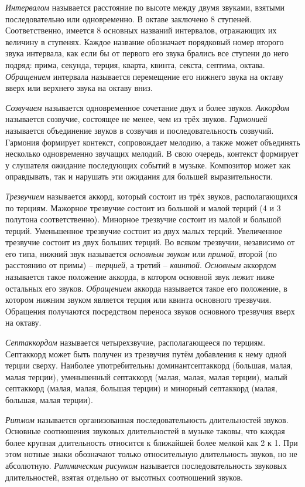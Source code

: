 \emph{Интервалом} называется расстояние по высоте между двумя звуками, взятыми
последовательно или одновременно. В октаве заключено 8 ступеней. Соответственно,
имеется 8 основных названий интервалов, отражающих их величину в ступенях.
Каждое название обозначает порядковый номер второго звука интервала, как если бы
от первого его звука брались все ступени до него подряд: прима, секунда, терция,
кварта, квинта, секста, септима, октава. \emph{Обращением} интервала называется
перемещение его нижнего звука на октаву вверх или верхнего звука на октаву вниз.

\emph{Созвучием} называется одновременное сочетание двух и более звуков.
\emph{Аккордом} называется созвучие, состоящее не менее, чем из трёх звуков.
\emph{Гармонией} называется объединение звуков в созвучия и последовательность
созвучий. Гармония формирует контекст, сопровождает мелодию, а также может
объединять несколько одновременно звучащих мелодий. В свою очередь, контекст
формирует у слушателя ожидание последующих событий в музыке. Композитор может
как оправдывать, так и нарушать эти ожидания для большей выразительности.

\emph{Трезвучием} называется аккорд, который состоит из трёх звуков,
располагающихся по терциям. Мажорное трезвучие состоит из большой и малой терций
(4 и 3 полутона соответственно). Минорное трезвучие состоит из малой и большой
терций. Уменьшенное трезвучие состоит из двух малых терций. Увеличенное
трезвучие состоит из двух больших терций. Во всяком трезвучии, независимо от его
типа, нижний звук называется \emph{основным звуком} или \emph{примой}, второй
(по расстоянию от примы) -- \emph{терцией}, а третий -- \emph{квинтой}.
\emph{Основным} аккордом называется такое положение аккорда, в котором основной
звук лежит ниже остальных его звуков. \emph{Обращением} аккорда называется такое
его положение, в котором нижним звуком является терция или квинта основного
трезвучия. Обращения получаются посредством переноса звуков основного трезвучия
вверх на октаву.

\emph{Септаккордом} называется четырехзвучие, располагающееся по терциям.
Септаккорд может быть получен из трезвучия путём добавления к нему одной терции
сверху. Наиболее употребительны доминантсептаккорд (большая, малая, малая
терции), уменьшенный септаккорд (малая, малая, малая терции), малый септаккорд
(малая, малая, большая терции) и минорный септаккорд (малая, большая, малая
терции).

\emph{Ритмом} называется организованная последовательность длительностей звуков.
Основные соотношения звуковых длительностей в музыке таковы, что каждая более
крупная длительность относится к ближайшей более мелкой как 2 к 1. При этом
нотные знаки обозначают только относительную длительность звуков, но не
абсолютную. \emph{Ритмическим рисунком} называется последовательность звуковых
длительностей, взятая отдельно от высотных соотношений звуков.

